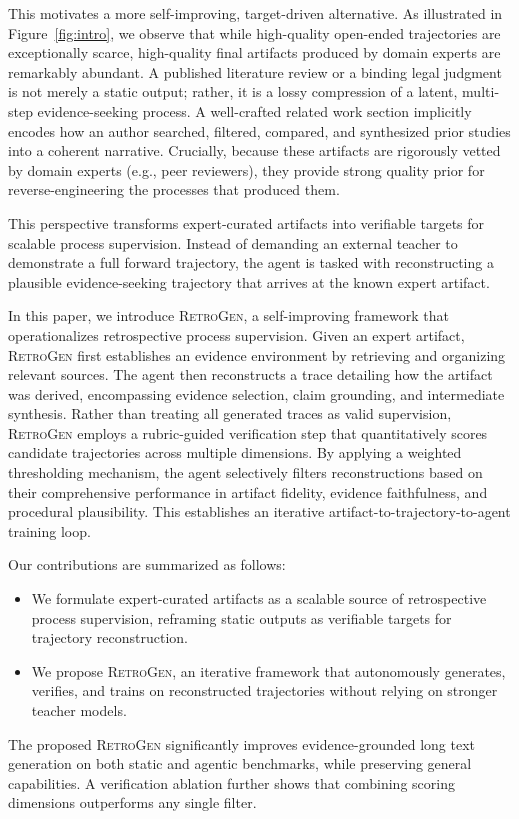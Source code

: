 This motivates a more self-improving, target-driven alternative. As illustrated in Figure~\ref{fig:intro}, we observe that while high-quality open-ended trajectories are exceptionally scarce, high-quality final artifacts produced by domain experts are remarkably abundant. A published literature review or a binding legal judgment is not merely a static output; rather, it is a lossy compression of a latent, multi-step evidence-seeking process. A well-crafted related work section implicitly encodes how an author searched, filtered, compared, and synthesized prior studies into a coherent narrative. Crucially, because these artifacts are rigorously vetted by domain experts (e.g., peer reviewers), they provide strong quality prior for reverse-engineering the processes that produced them.

This perspective transforms expert-curated artifacts into verifiable targets for scalable process supervision. Instead of demanding an external teacher to demonstrate a full forward trajectory, the agent is tasked with reconstructing a plausible evidence-seeking trajectory that arrives at the known expert artifact.

In this paper, we introduce \textsc{RetroGen}, a self-improving framework that operationalizes retrospective process supervision. Given an expert artifact, \textsc{RetroGen} first establishes an evidence environment by retrieving and organizing relevant sources. The agent then reconstructs a trace detailing how the artifact was derived, encompassing evidence selection, claim grounding, and intermediate synthesis. Rather than treating all generated traces as valid supervision, \textsc{RetroGen} employs a rubric-guided verification step that quantitatively scores candidate trajectories across multiple dimensions. By applying a weighted thresholding mechanism, the agent selectively filters reconstructions based on their comprehensive performance in artifact fidelity, evidence faithfulness, and procedural plausibility. This establishes an iterative artifact-to-trajectory-to-agent training loop.

Our contributions are summarized as follows:
\begin{itemize}[leftmargin=*, topsep=1pt, partopsep=0pt, itemsep=0pt, parsep=3pt] 
    \item We formulate expert-curated artifacts as a scalable source of retrospective process supervision, reframing static outputs as verifiable targets for trajectory reconstruction.
    \item We propose \textsc{RetroGen}, an iterative framework that autonomously generates, verifies, and trains on reconstructed trajectories without relying on stronger teacher models.
\end{itemize}

The proposed \textsc{RetroGen} significantly improves evidence-grounded long text generation on both static and agentic benchmarks, while preserving general capabilities. A verification ablation further shows that combining scoring dimensions outperforms any single filter.